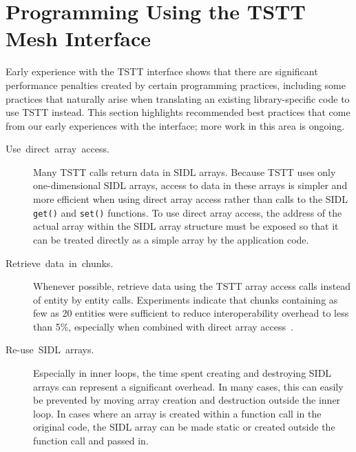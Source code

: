 
\section{Programming Using the TSTT Mesh Interface\label{sec:Programming}}

Early experience with the TSTT interface shows that there are significant
performance penalties created by certain programming practices, including
some practices that naturally arise when translating an existing library-specific
code to use TSTT instead. This section highlights recommended best
practices that come from our early experiences with the interface; more
work in this area is ongoing.

\begin{description}
\item [Use~direct~array~access.]Many TSTT calls return data in SIDL
arrays. Because TSTT uses only one-dimensional SIDL arrays, access to
data in these arrays is simpler and more efficient when using direct
array access rather than calls to the SIDL \texttt{get()} and
\texttt{set()} functions. To use direct array access, the address of the
actual array within the SIDL array structure must be exposed so that it
can be treated directly as a simple array by the application code.
\item [Retrieve~data~in~chunks.]Whenever possible, retrieve data using
the TSTT array access calls instead of entity by entity calls. Experiments
indicate that chunks containing as few as 20 entities were sufficient
to reduce interoperability overhead to less than 5\%, especially when
combined with direct array access~\cite{mcinnes05}.
\item [Re-use~SIDL~arrays.]Especially in inner loops, the time spent
creating and destroying SIDL arrays can represent a significant overhead.
In many cases, this can easily be prevented by moving array creation
and destruction outside the inner loop. In cases where an array is
created within a function call in the original code, the SIDL array
can be made static or created outside the function call and passed
in.
\end{description}

